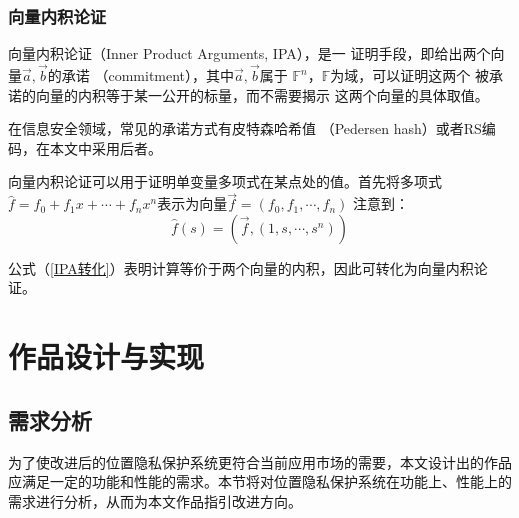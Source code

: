 \documentclass[zihao=-4]{ctexart}
\begin{document}
\subsubsection{向量内积论证}
向量内积论证（Inner Product Arguments, IPA），是一
证明手段，即给出两个向量$\vec{a},\vec{b}$的承诺
（commitment），其中$\vec{a},\vec{b}$属于
$\mathbb{F}^n$，$\mathbb{F}$为域，可以证明这两个
被承诺的向量的内积等于某一公开的标量，而不需要揭示
这两个向量的具体取值。\par
在信息安全领域，常见的承诺方式有皮特森哈希值
（Pedersen hash）或者RS编码，在本文中采用后者。\par
向量内积论证可以用于证明单变量多项式在某点处的值。首先将多项式
$\hat{f}=f_0+f_1x+\cdots+f_nx^n$表示为向量$\vec{f}=(f_0,f_1,\cdots,f_n)$
注意到：
\begin{equation}\hat{f}(s)=(\vec{f},(1,s,\cdots,s^n))\label{IPA转化}\end{equation}\par
公式（\ref{IPA转化}）表明计算等价于两个向量的内积，因此可转化为向量内积论证。




\section{作品设计与实现}

\subsection{需求分析}
为了使改进后的位置隐私保护系统更符合当前应用市场的需要，本文设计出的作品应满足一定的功能和性能的需求。本节将对位置隐私保护系统在功能上、性能上的需求进行分析，从而为本文作品指引改进方向。
\end{document}
